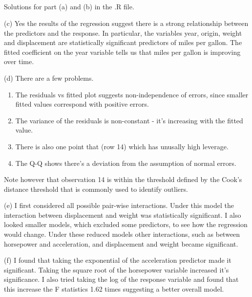 \documentclass{article}
\begin{document}
    \subsection{}
    Solutions for part (a) and (b) in the .R file.

    (c) Yes the results of the regression suggest there is a strong relationship between 
    the predictors and the response. In particular, the variables year, origin, weight and displacement 
    are statistically significant predictors of miles per gallon. The fitted coefficient on the year 
    variable tells us that miles per gallon is improving over time.

    (d) There are a few problems. 
    
    \begin{enumerate}
        \item  The residuals vs fitted plot suggests non-independence of errors,  
        since smaller fitted values correspond with positive errors. 
        \item The variance of the residuals is non-constant - it's increasing with the fitted value.
        \item There is also one point that (row 14) which has unusally high leverage. 
        \item The Q-Q shows there's a deviation from the assumption of normal errors.
    \end{enumerate}

    Note however that observation 14 is within the threshold defined by the Cook's distance threshold that is commonly 
    used to identify outliers. \par

    (e) I first considered all possible pair-wise interactions. Under this model the interaction between displacement and 
    weight was statistically significant. I also looked smaller models, which excluded some predictors, to see how the 
    regression would change. Under these reduced models other interactions, such as between horsepower and 
    acceleration, and displacement and weight became significant.

    (f) I found that taking the exponential of the acceleration predictor made it significant.
    Taking the square root of the horsepower variable increased it's significance. I also tried taking the log of
    the response variable and found that this increase the F statistics 1.62 times suggesting 
    a better overall model.

    \subsection{}
\end{document}
